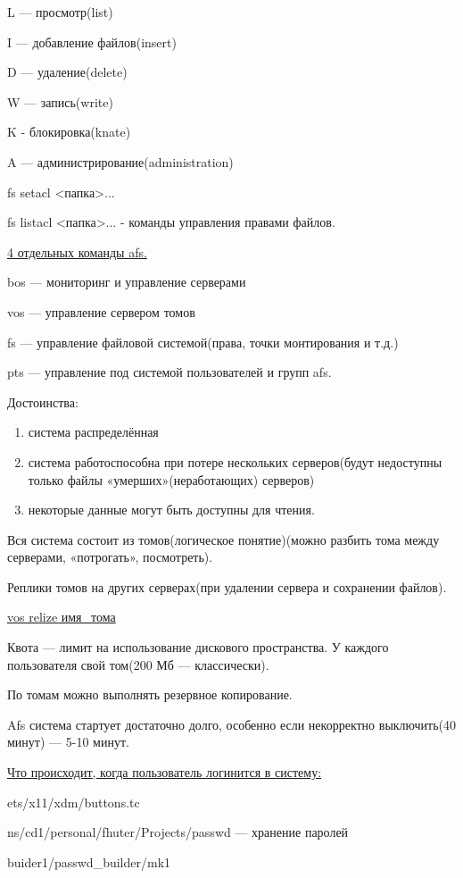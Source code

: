 \par 
L — просмотр(list) 

\par 
I — добавление файлов(insert)
\par 
D — удаление(delete) 

\par 
W — запись(write) 

\par 
K - блокировка(knate)
\par 
A — администрирование(administration)
\par fs
setacl <папка>...
\par 
fs listacl <папка>...  - команды
управления правами файлов.
\par 
\underline{4 отдельных команды afs.}
\par 
bos — мониторинг и управление
серверами
\par 
vos — управление сервером томов
\par 
fs — управление файловой
системой(права, точки монтирования и
т.д.)
\par 
pts — управление под системой
пользователей и групп afs.
\par 
Достоинства:
\begin{enumerate}
	\item \par 
	система распределённая
	\item \par 
	система работоспособна при
	потере нескольких серверов(будут
	недоступны только файлы «умерших»(неработающих)
	серверов)
	\item \par 
	некоторые данные могут быть
	доступны для чтения.
\end{enumerate}
\par 
Вся система состоит из
томов(логическое понятие)(можно разбить
тома между серверами, «потрогать»,
посмотреть).
\par 
Реплики томов на других серверах(при
удалении сервера и сохранении файлов).
\par 
\underline{vos relize имя\_тома}
\par 
Квота — лимит на использование
дискового пространства. У каждого
пользователя свой том(200 Мб — классически).
\par 
По томам можно выполнять резервное
копирование.
\par 
Afs система стартует достаточно
долго, особенно если некорректно
выключить(40 минут) — 5-10 минут.
\par 
\underline{Что происходит, когда пользователь
логинится в систему:}
\par 
ets/x11/xdm/buttons.tc
\par ns/cd1/personal/fhuter/Projects/passwd
— хранение паролей
\par 
buider1/passwd\_builder/mk1 

